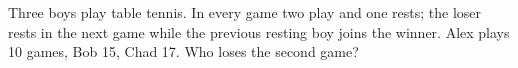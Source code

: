 Three boys play table tennis. In every game two play and one rests; the loser rests in the next game while the previous resting boy joins the winner. Alex plays 10 games, Bob 15, Chad 17. Who loses the second game?
